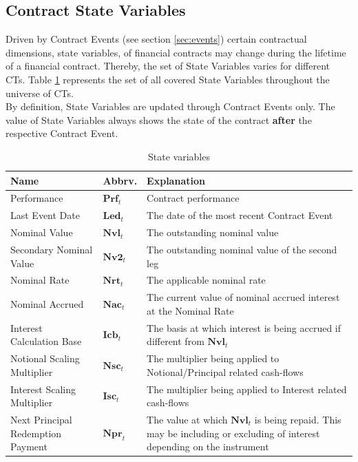 \documentclass[9pt,oneside]{amsart}
\newcommand{\svar}[2]{\textbf{#1}_{#2}}
\begin{document}
\begin{multicols}{2}

\section{Contract State Variables}\label{sec:statevars}

Driven by Contract Events (see section \ref{sec:events}) certain contractual dimensions, state variables, of financial contracts may change during the lifetime of a financial contract. Thereby, the set of State Variables varies for different CTs. Table \ref{tbl:statevars} represents the set of all covered State Variables throughout the universe of CTs.\\

By definition, State Variables are updated through Contract Events only. The value of State Variables always shows the state of the contract \textbf{after} the respective Contract Event.





\begin{table}[H]
	\centering
	\begin{tabular}{| p{0.8in}p{0.4in}p{1.6in} |}
	\hline
	\textbf{Name} & \textbf{Abbrv.} & \textbf{Explanation} \\
	\hline
	Performance & $\svar{Prf}{t}$ & Contract performance \\	
	\hline
	Last Event Date & $\svar{Led}{t}$ & The date of the most recent Contract Event \\
	\hline
	Nominal Value & $\svar{Nvl}{t}$ & The outstanding nominal value \\
	\hline
	Secondary Nominal Value & $\svar{Nv2}{t}$ & The outstanding nominal value of the second leg \\
	\hline
	Nominal Rate & $\svar{Nrt}{t}$ & The applicable nominal rate \\
	\hline
	Nominal Accrued & $\svar{Nac}{t}$ & The current value of nominal accrued interest at the Nominal Rate \\
	\hline
	Interest Calculation Base & $\svar{Icb}{t}$ & The basis at which interest is being accrued if different from $\svar{Nvl}{t}$ \\
	\hline
	Notional Scaling Multiplier & $\svar{Nsc}{t}$ & The multiplier being applied to Notional/Principal related
	cash-flows \\
	\hline
	Interest Scaling Multiplier & $\svar{Isc}{t}$ & The multiplier being applied to Interest related cash-flows \\
	\hline
	Next Principal Redemption Payment & $\svar{Npr}{t}$ & The value at which $\svar{Nvl}{t}$ is being repaid. This may be including or excluding of interest depending on the instrument\\
	\hline
	\end{tabular}
	\caption{State variables}
	\label{tbl:statevars}
\end{table}



\end{multicols}
\end{document}
